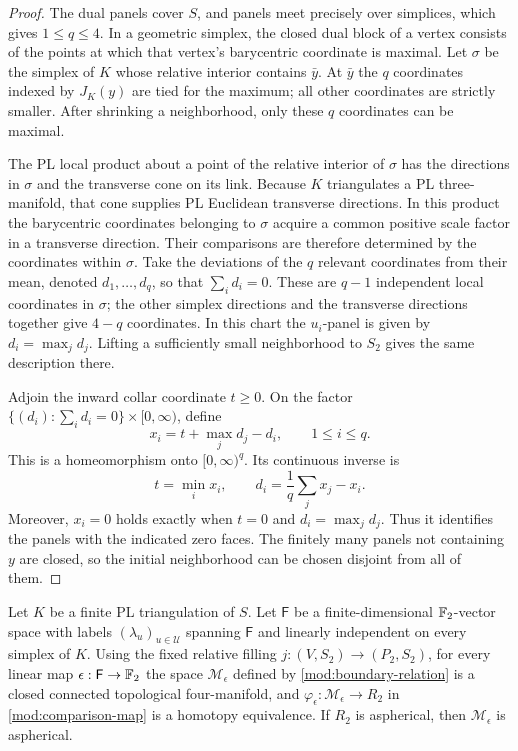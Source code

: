 \begin{proof}
The dual panels cover \(S\), and panels meet precisely over simplices,
which gives \(1\leq q\leq4\).  In a geometric simplex, the closed dual
block of a vertex consists of the points at which that vertex's
barycentric coordinate is maximal.  Let \(\sigma\) be the simplex of
\(K\) whose relative interior contains \(\bar y\).  At \(\bar y\)
the \(q\) coordinates indexed by \(J_K(y)\) are tied for the maximum;
all other coordinates are strictly smaller.  After shrinking a
neighborhood, only these \(q\) coordinates can be maximal.

The PL local product about a point of the relative interior of
\(\sigma\) has the directions in \(\sigma\) and the transverse cone
on its link.  Because \(K\) triangulates a PL three-manifold, that cone
supplies PL Euclidean transverse directions.  In this product the
barycentric coordinates belonging to \(\sigma\) acquire a common
positive scale factor in a transverse direction.  Their comparisons
are therefore determined by the coordinates within \(\sigma\).
Take the deviations of the \(q\) relevant coordinates from their
mean, denoted \(d_1,\ldots,d_q\), so that \(\sum_i d_i=0\).
These are \(q-1\) independent local coordinates in \(\sigma\); the
other simplex directions and the transverse directions together give
\(4-q\) coordinates.  In this chart the \(u_i\)-panel is given by
\(d_i=\max_j d_j\).  Lifting a sufficiently small neighborhood to
\(S_2\) gives the same description there.

Adjoin the inward collar coordinate \(t\geq0\).  On the factor
\(\{(d_i):\sum_i d_i=0\}\times[0,\infty)\), define
\begin{equation}\label{mod:orthant-coordinates}
 x_i=t+\max_j d_j-d_i,\qquad 1\leq i\leq q.
\end{equation}
This is a homeomorphism onto \([0,\infty)^q\).  Its continuous inverse
is
\[
 t=\min_i x_i,\qquad
 d_i=\frac1q\sum_jx_j-x_i.
\]
Moreover, \(x_i=0\) holds exactly when \(t=0\) and
\(d_i=\max_jd_j\).  Thus it identifies the panels with the indicated
zero faces.  The finitely many panels not containing \(y\) are closed,
so the initial neighborhood can be chosen disjoint from all of them.
\end{proof}

\begin{proposition}
\label{mod:models}
Let \(K\) be a finite PL triangulation of \(S\).  Let \(\mathsf F\)
be a finite-dimensional \(\mathbb F_2\)-vector space with labels
\((\lambda_u)_{u\in\mathcal U}\) spanning \(\mathsf F\) and linearly
independent on every simplex of \(K\).  Using the fixed relative
filling \(j:(V,S_2)\to(P_2,S_2)\), for every linear map
\(\epsilon:\mathsf F\to\mathbb F_2\) the space \(\mathcal M_\epsilon\)
defined by \eqref{mod:boundary-relation} is a closed connected
topological four-manifold, and
\(\varphi_\epsilon:\mathcal M_\epsilon\to R_2\) in
\eqref{mod:comparison-map} is a homotopy equivalence.  If \(R_2\) is
aspherical, then \(\mathcal M_\epsilon\) is aspherical.
\end{proposition}

